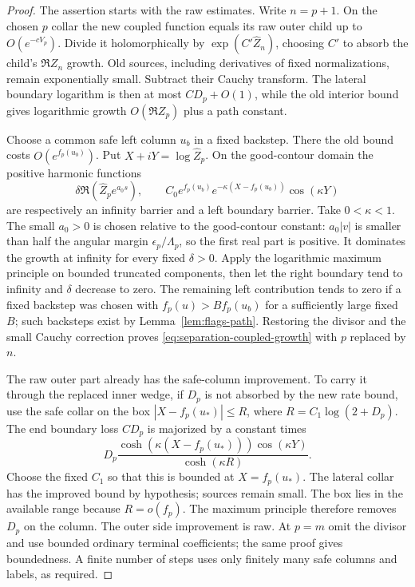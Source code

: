 \begin{proof}
The assertion starts with the raw estimates.  Write $n=p+1$.
On the chosen $p$ collar the new coupled function equals its raw
outer child up to $O(e^{-cV_p})$.  Divide it holomorphically by
$\exp(C'\widehat Z_n)$, choosing $C'$ to absorb the child's
$\Re Z_n$ growth.  Old sources, including derivatives of fixed
normalizations, remain exponentially small.  Subtract their
Cauchy transform.  The lateral boundary logarithm is then at
most $CD_p+O(1)$, while the old interior bound gives logarithmic
growth $O(\Re Z_p)$ plus a path constant.

Choose a common safe left column $u_b$ in a fixed backstep.
There the old bound costs $O(e^{f_p(u_b)})$.  Put
$X+iY=\log\widehat Z_p$.  On the good-contour domain the positive
harmonic functions
\begin{equation}\label{eq:separation-growth-barriers}
 \delta\Re(\widehat Z_p e^{a_0s}),\qquad
 C_0e^{f_p(u_b)}e^{-\kappa(X-f_p(u_b))}\cos(\kappa Y)
\end{equation}
are respectively an infinity barrier and a left boundary barrier.
Take $0<\kappa<1$.  The small $a_0>0$ is chosen relative to the
good-contour constant: $a_0|v|$ is smaller than half the angular
margin $\epsilon_p/\Lambda_p$, so the first real part is positive.
It dominates the growth at infinity for every fixed $\delta>0$.
Apply the logarithmic maximum principle on bounded truncated
components, then let the right boundary tend to infinity and
$\delta$ decrease to zero.  The remaining left contribution tends
to zero if a fixed backstep was chosen with
$f_p(u)>Bf_p(u_b)$ for a sufficiently large fixed $B$; such
backsteps exist by Lemma~\ref{lem:flags-path}.  Restoring the
divisor and the small Cauchy correction proves
\eqref{eq:separation-coupled-growth} with $p$ replaced by $n$.

The raw outer part already has the safe-column improvement.
To carry it through the replaced inner wedge, if $D_p$ is not
absorbed by the new rate bound, use the safe collar on the box
$|X-f_p(u_*)|\leq R$, where $R=C_1\log(2+D_p)$.
The end boundary loss $CD_p$ is majorized by a constant times
\[
 D_p\frac{\cosh(\kappa(X-f_p(u_*)))\cos(\kappa Y)}
               {\cosh(\kappa R)}.
\]
Choose the fixed $C_1$ so that this is bounded at $X=f_p(u_*)$.
The lateral collar has the improved bound by hypothesis; sources
remain small.  The box lies in the available range because
$R=o(f_p)$.  The maximum principle therefore removes $D_p$ on
the column.  The outer side improvement is raw.  At $p=m$ omit
the divisor and use bounded ordinary terminal coefficients;
the same proof gives boundedness.  A finite number of steps uses
only finitely many safe columns and labels, as required.
\end{proof}


